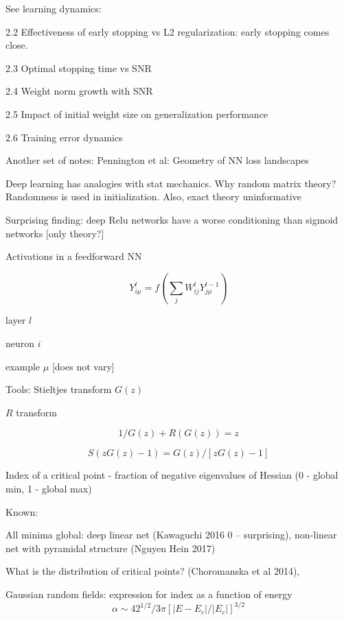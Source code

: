\documentclass[english]{article}
\begin{document}
See learning dynamics: 

2.2 Effectiveness of early stopping vs L2 regularization: early stopping comes close.

2.3 Optimal stopping time vs SNR

2.4 Weight norm growth with SNR

2.5 Impact of initial weight size on generalization performance

2.6 Training error dynamics
\eenum

Another set of notes: Pennington et al: Geometry of NN loss landscapes


\benum

\item Deep learning has analogies with stat mechanics. Why random matrix theory? Randomness is used in initialization. Also, exact theory uninformative


Surprising finding: deep Relu networks have a worse conditioning than sigmoid networks [only theory?]

\item Activations in a feedforward NN

$$Y_{i\mu}^l = f(\sum_j W_{ij}^l Y_{j\mu}^{l-1})$$

\benum
\item layer $l$

\item neuron $i$

\item example $\mu$ [does not vary]
\eenum
\item Tools: 
Stieltjes transform $G(z)$

$R$ transform

$$1/G(z) + R(G(z)) = z$$

$$S(zG(z)-1) = G(z)/[zG(z)-1]$$


\item Index of a critical point - fraction of negative eigenvalues of Hessian (0 - global min, 1 - global max)

Known:

All minima global: deep linear net (Kawaguchi 2016 0 -- surprising), non-linear net with pyramidal structure (Nguyen Hein 2017)

\item 
What is the distribution of critical  points? (Choromanska et al 2014), 

Gaussian random fields: expression for index as a function of energy $$\alpha \sim 42^{1/2}/3\pi [|E - E_c|/|E_c|]^{3/2}$$
\end{document}
